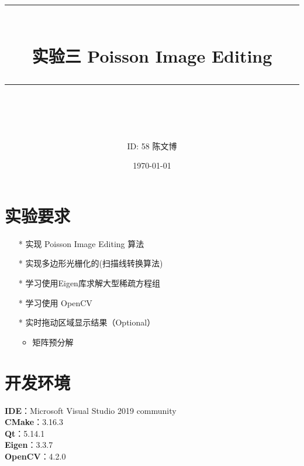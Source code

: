 \documentclass[14pt]{scrartcl} %
\title{	
	\normalfont\normalsize
	\rule{\linewidth}{0.5pt}\\ %
	\vspace{20pt} %
	{\huge 实验三	Poisson Image Editing}\\ %
	\vspace{12pt} %
	\rule{\linewidth}{2pt}\\ %
	\vspace{12pt} %
}
\author{\LARGE ID: 58		陈文博} %
\date{\normalsize\today} %
\begin{document}
\maketitle %


\section{实验要求}


\begin{itemize}
	\item[*] 实现 Poisson Image Editing 算法
	\item[*] 实现多边形光栅化的(扫描线转换算法)
	\item[*] 学习使用Eigen库求解大型稀疏方程组
	\item[*] 学习使用 OpenCV
	\item[*] 实时拖动区域显示结果（Optional）
	\begin{itemize}
		\item 矩阵预分解
	\end{itemize}
\end{itemize}


\section{开发环境}

\textbf{IDE}：Microsoft Visual Studio 2019 community\\
\textbf{CMake}：3.16.3\\
\textbf{Qt}：5.14.1\\
\textbf{Eigen}：3.3.7\\
\textbf{OpenCV}：4.2.0


\pagebreak
\end{document}
